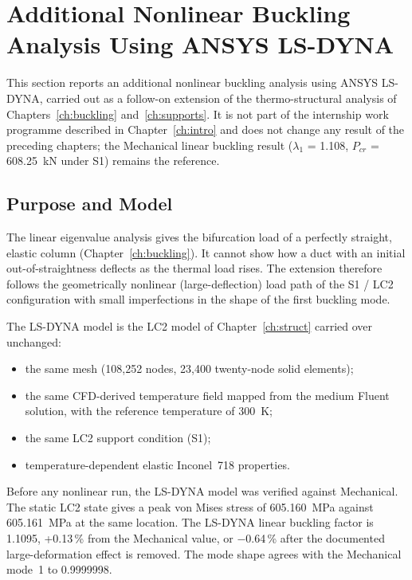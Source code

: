\section{Additional Nonlinear Buckling Analysis Using ANSYS LS-DYNA}\label{sec:lsdyna}
This section reports an additional nonlinear buckling analysis using ANSYS LS-DYNA, carried out as a follow-on extension of the
thermo-structural analysis of Chapters~\ref{ch:buckling} and~\ref{ch:supports}. It is not part of the internship work programme described in
Chapter~\ref{ch:intro} and does not change any result of the preceding chapters; the Mechanical linear buckling result ($\lambda_1$ = 1.108,
$P_{cr}$ = 608.25~kN under S1) remains the reference.

\subsection{Purpose and Model}
The linear eigenvalue analysis gives the bifurcation load of a perfectly straight, elastic column (Chapter~\ref{ch:buckling}). It cannot show how a duct
with an initial out-of-straightness deflects as the thermal load rises. The extension therefore follows the geometrically nonlinear
(large-deflection) load path of the S1 / LC2 configuration with small imperfections in the shape of the first buckling mode.

The LS-DYNA model is the LC2 model of Chapter~\ref{ch:struct} carried over unchanged:
\begin{itemize}
\item the same mesh (108,252 nodes, 23,400 twenty-node solid elements);
\item the same CFD-derived temperature field mapped from the medium Fluent solution, with the reference temperature of 300~K;
\item the same LC2 support condition (S1);
\item temperature-dependent elastic Inconel~718 properties.
\end{itemize}
Before any nonlinear run, the LS-DYNA model was verified against Mechanical. The static LC2 state gives a peak von Mises stress of
605.160~MPa against 605.161~MPa at the same location. The LS-DYNA linear buckling factor is 1.1095, +0.13\,\% from the Mechanical value, or
$-$0.64\,\% after the documented large-deformation effect is removed. The mode shape agrees with the Mechanical mode~1 to 0.9999998.

